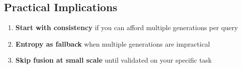 \subsection{Practical Implications}

\begin{enumerate}
    \item \textbf{Start with consistency} if you can afford multiple generations per query
    \item \textbf{Entropy as fallback} when multiple generations are impractical
    \item \textbf{Skip fusion at small scale} until validated on your specific task
\end{enumerate}
